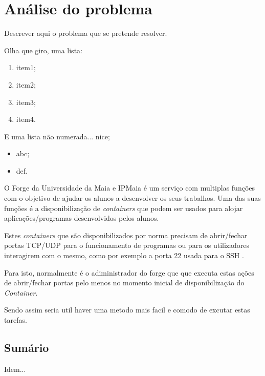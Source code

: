 \chapter{Análise do problema}
\label{cap:problem}

Descrever aqui o problema que se pretende resolver.


Olha que giro, uma lista:

\begin{enumerate}
    \item item1;
    \item item2;
    \item item3;
    \item item4.
\end{enumerate}


E uma lista não numerada... nice;

\begin{itemize}
    \item abc;
    \item def.
\end{itemize}

O Forge da Universidade da Maia e IPMaia é um serviço com multiplas funções com 
o objetivo de ajudar os alunos a desenvolver os seus trabalhos. Uma das suas 
funções é a disponibilização de \textit{containers} que podem ser usados
para alojar aplicações/programas desenvolvidos pelos alunos.

Estes \textit{containers} que são disponibilizados por norma precisam de 
abrir/fechar portas TCP/UDP para o funcionamento de programas ou para os
utilizadores interagirem com o mesmo, como por exemplo a porta 22 usada para o 
SSH \cite{rfc4253}.

Para isto, normalmente é o adiministrador do forge que que executa estas ações
de abrir/fechar portas pelo menos no momento inicial de disponibilização
do \textit{Container}.

Sendo assim seria util haver uma metodo mais facil e comodo de excutar estas
tarefas.



\section*{Sumário}

Idem... 
